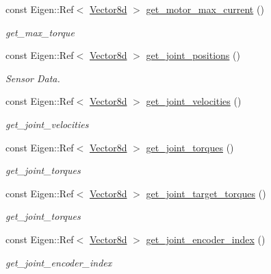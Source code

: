\begin{DoxyCompactItemize}
const Eigen\+::\+Ref$<$ \hyperlink{common__header_8hpp_a98975ffbe0bca1296078e0350dfedd60}{Vector8d} $>$ \hyperlink{classblmc__robots_1_1Solo8_a8c956e9a0a891992fa593b932a385095}{get\+\_\+motor\+\_\+max\+\_\+current} ()
\begin{DoxyCompactList}\small\item\em get\+\_\+max\+\_\+torque \end{DoxyCompactList}\item 
const Eigen\+::\+Ref$<$ \hyperlink{common__header_8hpp_a98975ffbe0bca1296078e0350dfedd60}{Vector8d} $>$ \hyperlink{classblmc__robots_1_1Solo8_ab067a976ebce2882b84e2d115832839d}{get\+\_\+joint\+\_\+positions} ()
\begin{DoxyCompactList}\small\item\em Sensor Data. \end{DoxyCompactList}\item 
const Eigen\+::\+Ref$<$ \hyperlink{common__header_8hpp_a98975ffbe0bca1296078e0350dfedd60}{Vector8d} $>$ \hyperlink{classblmc__robots_1_1Solo8_a2e27aa306a9f2a1812274156314eed9b}{get\+\_\+joint\+\_\+velocities} ()
\begin{DoxyCompactList}\small\item\em get\+\_\+joint\+\_\+velocities \end{DoxyCompactList}\item 
const Eigen\+::\+Ref$<$ \hyperlink{common__header_8hpp_a98975ffbe0bca1296078e0350dfedd60}{Vector8d} $>$ \hyperlink{classblmc__robots_1_1Solo8_a31b0684570b478967034513a4ade8031}{get\+\_\+joint\+\_\+torques} ()
\begin{DoxyCompactList}\small\item\em get\+\_\+joint\+\_\+torques \end{DoxyCompactList}\item 
const Eigen\+::\+Ref$<$ \hyperlink{common__header_8hpp_a98975ffbe0bca1296078e0350dfedd60}{Vector8d} $>$ \hyperlink{classblmc__robots_1_1Solo8_ac18587cbf727c3da1432f1baea9c7e2a}{get\+\_\+joint\+\_\+target\+\_\+torques} ()
\begin{DoxyCompactList}\small\item\em get\+\_\+joint\+\_\+torques \end{DoxyCompactList}\item 
const Eigen\+::\+Ref$<$ \hyperlink{common__header_8hpp_a98975ffbe0bca1296078e0350dfedd60}{Vector8d} $>$ \hyperlink{classblmc__robots_1_1Solo8_ad9de077a2752f30109afeea1c97e77a6}{get\+\_\+joint\+\_\+encoder\+\_\+index} ()
\begin{DoxyCompactList}\small\item\em get\+\_\+joint\+\_\+encoder\+\_\+index \end{DoxyCompactList}\item 

\end{DoxyCompactItemize}
